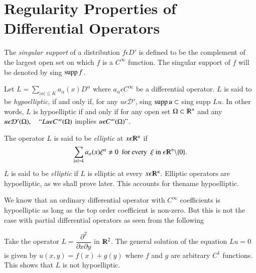 \section{Regularity Properties of Differential
  Operators}\label{chap2:sec2} %

\setcounter{defi}{6}
\begin{defi} \label{chap2:sec2:def2.7}%
  The \textit{singular support} of a distribution $f \epsilon D'$ is
  defined to be the complement of the largest open set on which $f$ is
  a $C^ \infty$ function. The singular support of $f$ will be denoted by
  sing $\operatorname{supp} f$. 
\end{defi} 

\begin{defi} \label{chap2:sec2:def2.8}%
Let $L= \sum \limits_{| \alpha | \leq K } a_{\alpha}(x) D^{\alpha}$
where $a_{\alpha }\epsilon C^{\infty}$ be a differential
operator. $L$ is said to be \textit{hypoelliptic}, if and only if, for
any $u \epsilon \mathcal{D}'$, sing $\operatorname{supp}  u\subset $ sing supp
$Lu$. In other words, $L$ is hypoelliptic if and only if for any open
set $\Omega \subset \varmathbb{R}^n$ and any $u \epsilon \mathcal
{D}' (\Omega), \quad ``Lu \epsilon C^{\infty}( \Omega)$ implies $u
\epsilon C^{\infty}( \Omega)"$. 
\end{defi}

\setcounter{rem}{8}
\begin{rem} \label{chap2:sec2:rem2.9}%
  The operator $L$ is said to be \textit{elliptic } at $x \epsilon
  \varmathbb{R}^n$ if  
  $$
  \sum_{| \alpha | = k} a_{\alpha}(x) \xi^\alpha \neq 0 ~\text{ for every }~
  \xi ~\text{in}~ \epsilon \varmathbb{R}^n \backslash \{0\}. 
  $$
  $L$ is said to be \textit{elliptic} if $L$ is elliptic at every $x
  \epsilon \varmathbb{R}^n$. Elliptic operators are hypoelliptic, as
  we shall prove later. This accounts for the\pageoriginale name hypoelliptic. 
\end{rem}

We know that an ordinary differential operator with $C^{\infty}$
coefficients is hypoelliptic as long as the top order coefficient is
non-zero. But this is not the case with partial differential operators
as seen from the following  

\setcounter{example}{9}
\begin{example} \label{chap2:sec2:exp2.10}%
  Take the operator $L= \dfrac{\partial^2}{\partial x \partial y} $ in
  $\varmathbb{R}^2$. The general solution of the equation
  $Lu = 0$ is given by $u(x,y)= f(x)+ g(y)$ where $f$ and $g$ are
  arbitrary $C^1$ functions. This shows that $L$ is not hypoelliptic. 
\end{example}

